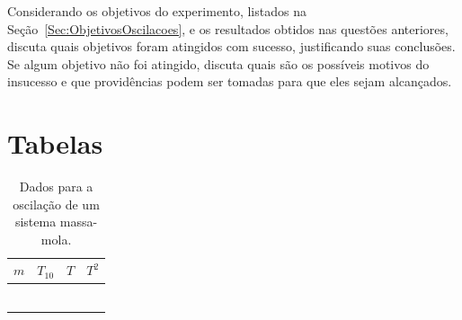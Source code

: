 \begin{question}[type={exam}]
Considerando os objetivos do experimento, listados na Seção~\ref{Sec:ObjetivosOscilacoes}, e os resultados obtidos nas questões anteriores, discuta quais objetivos foram atingidos com sucesso, justificando suas conclusões. Se algum objetivo não foi atingido, discuta quais são os possíveis motivos do insucesso e que providências podem ser tomadas para que eles sejam alcançados.
\end{question}

\vfill
\pagebreak
\section{Tabelas}
\begin{table}[!htb]
\label{Tab:DadosMassaMola}
	\begin{center}
		\begin{tabular}{p{25mm}p{25mm}p{25mm}p{25mm}}
		\toprule
		$m$ & $T_{10}$ & $T$ & $T^2$ \\
		\midrule
		\cellcolor[gray]{0.89} & \cellcolor[gray]{0.92} & \cellcolor[gray]{0.89} & \cellcolor[gray]{0.92} \\
		\cellcolor[gray]{0.95} & \cellcolor[gray]{0.97} & \cellcolor[gray]{0.95} & \cellcolor[gray]{0.97} \\
		\cellcolor[gray]{0.89} & \cellcolor[gray]{0.92} & \cellcolor[gray]{0.89} & \cellcolor[gray]{0.92} \\
		\cellcolor[gray]{0.95} & \cellcolor[gray]{0.97} & \cellcolor[gray]{0.95} & \cellcolor[gray]{0.97} \\
		\cellcolor[gray]{0.89} & \cellcolor[gray]{0.92} & \cellcolor[gray]{0.89} & \cellcolor[gray]{0.92} \\
		\cellcolor[gray]{0.95} & \cellcolor[gray]{0.97} & \cellcolor[gray]{0.95} & \cellcolor[gray]{0.97} \\
		\bottomrule
		\end{tabular}
	\end{center}
	\caption{Dados para a oscilação de um sistema massa-mola.}
\end{table}
%
%
